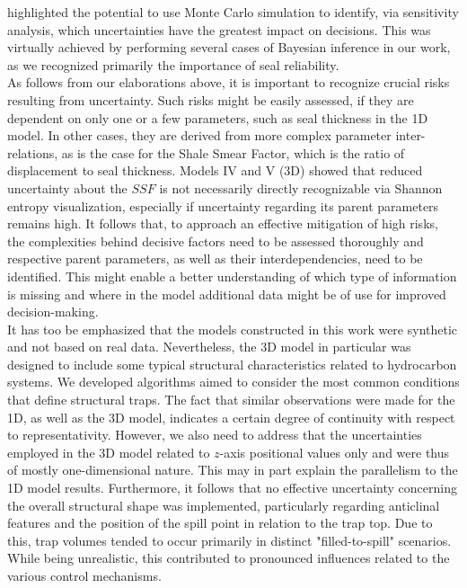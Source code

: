 	\citet{bratvold2010making} highlighted the potential to use Monte Carlo simulation to identify, via sensitivity analysis, which uncertainties have the greatest impact on  decisions. This was virtually achieved by performing several cases of Bayesian inference in our work, as we recognized primarily the importance of seal reliability.\\		
	As follows from our elaborations above, it is important to recognize crucial risks resulting from uncertainty. Such risks might be easily assessed, if they are dependent on only one or a few parameters, such as seal thickness in the 1D model. In other cases, they are derived from more complex parameter inter-relations, as is the case for the Shale Smear Factor, which is the ratio of displacement to seal thickness. Models IV and V (3D) showed that reduced uncertainty about the $SSF$ is not necessarily directly recognizable via Shannon entropy visualization, especially if uncertainty regarding its parent parameters remains high. It follows that, to approach an effective mitigation of high risks, the complexities behind decisive factors need to be assessed thoroughly and respective parent parameters, as well as their interdependencies, need to be identified. This might enable a better understanding of which type of information is missing and where in the model additional data might be of use for improved decision-making.\\	
	It has too be emphasized that the models constructed in this work were synthetic and not based on real data. Nevertheless, the 3D model in particular was designed to include some typical structural characteristics related to hydrocarbon systems. We developed algorithms aimed to consider the most common conditions that define structural traps. The fact that similar observations were made for the 1D, as well as the 3D model, indicates a certain degree of continuity with respect to representativity. However, we also need to address that the uncertainties employed in the 3D model related to $z$-axis positional values only and were thus of mostly  one-dimensional nature. This may in part explain the parallelism to the 1D model results. Furthermore, it follows that no effective uncertainty concerning the overall structural shape was implemented, particularly regarding anticlinal features and the position of the spill point in relation to the trap top. Due to this, trap volumes tended to occur primarily in distinct "filled-to-spill" scenarios. While being unrealistic, this contributed to pronounced influences related to the various control mechanisms.\\	
